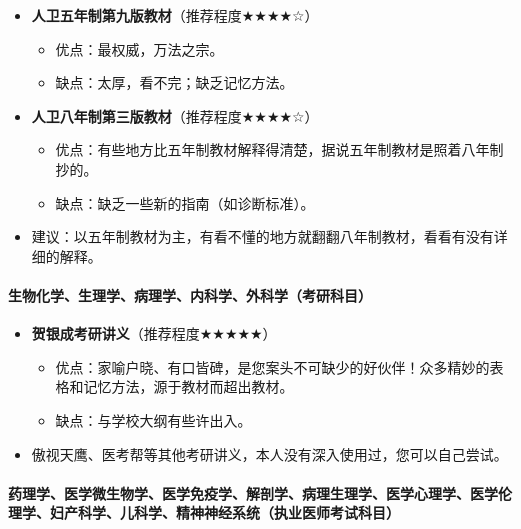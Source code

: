 \documentclass[zihao=-4,fontset=none]{Beautybook-CN}
\begin{document}
\begin{itemize}
	\item \textbf{人卫五年制第九版教材}（推荐程度${\bigstar}$${\bigstar}$${\bigstar}$${\bigstar}$☆）
	      \begin{itemize}
	      	\item 优点：最权威，万法之宗。
	      	\item 缺点：太厚，看不完；缺乏记忆方法。
	      \end{itemize}
	      	      
	\item \textbf{人卫八年制第三版教材}（推荐程度${\bigstar}$${\bigstar}$${\bigstar}$${\bigstar}$☆）
	      \begin{itemize}
	      	\item 优点：有些地方比五年制教材解释得清楚，据说五年制教材是照着八年制抄的。
	      	\item 缺点：缺乏一些新的指南（如诊断标准）。
	      \end{itemize}
	      	      
	\item 建议：以五年制教材为主，有看不懂的地方就翻翻八年制教材，看看有没有详细的解释。
\end{itemize}
\paragraph{\textbf{生物化学、生理学、病理学、内科学、外科学（考研科目）}}


\begin{itemize}
	\item \textbf{贺银成考研讲义}（推荐程度${\bigstar}$${\bigstar}$${\bigstar}$${\bigstar}$${\bigstar}$）
	      \begin{itemize}
	      	\item 优点：家喻户晓、有口皆碑，是您案头不可缺少的好伙伴！众多精妙的表格和记忆方法，源于教材而超出教材。
	      	\item 缺点：与学校大纲有些许出入。
	      \end{itemize}
	      	      
	\item 傲视天鹰、医考帮等其他考研讲义，本人没有深入使用过，您可以自己尝试。
\end{itemize}
\paragraph{\textbf{药理学、医学微生物学、医学免疫学、解剖学、病理生理学、医学心理学、医学伦理学、妇产科学、儿科学、精神神经系统（执业医师考试科目）}}
\end{document}
